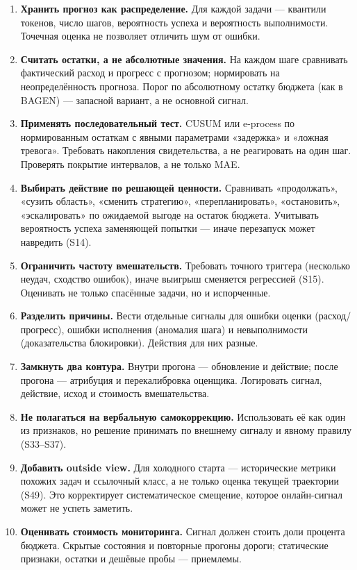 \documentclass[11pt,a4paper]{article}
\begin{document}
\begin{enumerate}
  \item \textbf{Хранить прогноз как распределение.} Для каждой задачи —
        квантили токенов, число шагов, вероятность успеха и вероятность
        выполнимости. Точечная оценка не позволяет отличить шум от
        ошибки.
  \item \textbf{Считать остатки, а не абсолютные значения.} На каждом шаге
        сравнивать фактический расход и прогресс с прогнозом; нормировать
        на неопределённость прогноза. Порог по абсолютному остатку бюджета
        (как в BAGEN) — запасной вариант, а не основной сигнал.
  \item \textbf{Применять последовательный тест.} CUSUM или e-process по
        нормированным остаткам с явными параметрами «задержка» и «ложная
        тревога». Требовать накопления свидетельства, а не реагировать на
        один шаг. Проверять покрытие интервалов, а не только MAE.
  \item \textbf{Выбирать действие по решающей ценности.} Сравнивать
        «продолжать», «сузить область», «сменить стратегию»,
        «перепланировать», «остановить», «эскалировать» по ожидаемой
        выгоде на остаток бюджета. Учитывать вероятность успеха
        заменяющей попытки — иначе перезапуск может навредить
        (S14).
  \item \textbf{Ограничить частоту вмешательств.} Требовать точного
        триггера (несколько неудач, сходство ошибок), иначе выигрыш
        сменяется регрессией (S15). Оценивать не только спасённые задачи,
        но и испорченные.
  \item \textbf{Разделить причины.} Вести отдельные сигналы для ошибки
        оценки (расход/прогресс), ошибки исполнения (аномалия шага) и
        невыполнимости (доказательства блокировки). Действия для них
        разные.
  \item \textbf{Замкнуть два контура.} Внутри прогона — обновление и
        действие; после прогона — атрибуция и перекалибровка оценщика.
        Логировать сигнал, действие, исход и стоимость вмешательства.
  \item \textbf{Не полагаться на вербальную самокоррекцию.} Использовать
        её как один из признаков, но решение принимать по внешнему
        сигналу и явному правилу (S33--S37).
  \item \textbf{Добавить outside view.} Для холодного старта — исторические
        метрики похожих задач и ссылочный класс, а не только оценка
        текущей траектории (S49). Это корректирует систематическое
        смещение, которое онлайн-сигнал может не успеть заметить.
  \item \textbf{Оценивать стоимость мониторинга.} Сигнал должен стоить
        доли процента бюджета. Скрытые состояния и повторные прогоны
        дороги; статические признаки, остатки и дешёвые пробы — приемлемы.
\end{enumerate}
\end{document}
